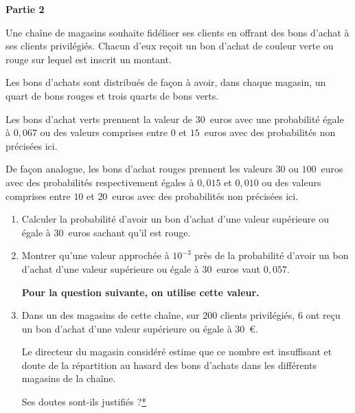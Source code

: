 \documentclass[12pt,frenchb]{article}
\begin{document}
\begin{question}[subtitle={Métropole 2015}]
\textbf{Partie 2}
	
	\medskip
	
Une chaîne de magasins souhaite fidéliser ses clients en offrant des bons d'achat à ses clients
privilégiés. Chacun d'eux reçoit un bon d'achat de couleur verte ou rouge sur lequel est inscrit un montant.
	
Les bons d'achats sont distribués de façon à avoir, dans chaque magasin, un quart de bons rouges et trois quarts de bons verts.
	
Les bons d'achat verts prennent la valeur de $30$~euros avec une probabilité égale à $0,067$ ou des valeurs comprises entre $0$ et $15$~euros avec des probabilités non précisées ici.
	
De façon analogue, les bons d'achat rouges prennent les valeurs $30$ ou $100$~euros avec des probabilités respectivement égales à $0,015$ et $0,010$ ou des valeurs comprises entre $10$ et $20$~euros avec des probabilités non précisées ici.

\medskip

\begin{enumerate}
\item Calculer la probabilité d'avoir un bon d'achat d'une valeur supérieure ou égale à $30$~euros sachant qu'il est rouge.
\item Montrer qu'une valeur approchée à $10^{-3}$ près de la probabilité d'avoir un bon d'achat d'une valeur supérieure ou égale à $30$~euros vaut $0,057$.

\textbf{Pour la question suivante, on utilise cette valeur.}

\item Dans un des magasins de cette chaîne, sur $200$ clients privilégiés, $6$ ont reçu un bon d'achat d'une valeur supérieure ou égale à $30$~\euro.

\smallskip

Le directeur du magasin considéré estime que ce nombre est insuffisant et doute de la répartition
au hasard des bons d'achats dans les différents magasins de la chaîne.

Ses doutes sont-ils justifiés ?\hyperlink{Index}{*}
\end{enumerate}

\end{question}
\end{document}
